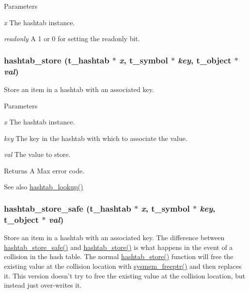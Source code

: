 \begin{DoxyParams}{Parameters}
\item[{\em x}]The hashtab instance. \item[{\em readonly}]A 1 or 0 for setting the readonly bit. \end{DoxyParams}
\hypertarget{group__hashtab_gaa26ebe9ba21e84dd0dbb8d5aed12e5a1}{
\subsubsection[{hashtab\_\-store}]{ hashtab\_\-store ({\bf t\_\-hashtab} $\ast$ {\em x}, \/  {\bf t\_\-symbol} $\ast$ {\em key}, \/  {\bf t\_\-object} $\ast$ {\em val})}}
\label{group__hashtab_gaa26ebe9ba21e84dd0dbb8d5aed12e5a1}


Store an item in a hashtab with an associated key. 
\begin{DoxyParams}{Parameters}
\item[{\em x}]The hashtab instance. \item[{\em key}]The key in the hashtab with which to associate the value. \item[{\em val}]The value to store.\end{DoxyParams}
\begin{DoxyReturn}{Returns}
A Max error code. 
\end{DoxyReturn}
\begin{DoxySeeAlso}{See also}
\hyperlink{group__hashtab_gadb206ea811204926bdbf1aa00ca679dc}{hashtab\_\-lookup()} 
\end{DoxySeeAlso}
\hypertarget{group__hashtab_ga31d25e5b56c439be3f31bf17efa36349}{
\subsubsection[{hashtab\_\-store\_\-safe}]{ hashtab\_\-store\_\-safe ({\bf t\_\-hashtab} $\ast$ {\em x}, \/  {\bf t\_\-symbol} $\ast$ {\em key}, \/  {\bf t\_\-object} $\ast$ {\em val})}}
\label{group__hashtab_ga31d25e5b56c439be3f31bf17efa36349}


Store an item in a hashtab with an associated key. The difference between \hyperlink{group__hashtab_ga31d25e5b56c439be3f31bf17efa36349}{hashtab\_\-store\_\-safe()} and \hyperlink{group__hashtab_gaa26ebe9ba21e84dd0dbb8d5aed12e5a1}{hashtab\_\-store()} is what happens in the event of a collision in the hash table. The normal \hyperlink{group__hashtab_gaa26ebe9ba21e84dd0dbb8d5aed12e5a1}{hashtab\_\-store()} function will free the existing value at the collision location with \hyperlink{group__memory_ga200c82639e547869db1f3887d17102d3}{sysmem\_\-freeptr()} and then replaces it. This version doesn't try to free the existing value at the collision location, but instead just over-\/writes it.


